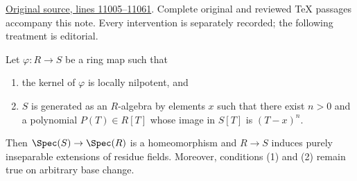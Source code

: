 \noindent\href{https://github.com/stacks/stacks-project/blob/a04446e57ec1fbc252a871afcec7752fb2807b14/algebra.tex\#L11005}{Original source, lines 11005--11061}. Complete original and reviewed TeX passages accompany this note. Every intervention is separately recorded; the following treatment is editorial.


\begin{lemma}
\label{editorial-source-lemma-universally-bijective}
Let $\varphi : R \to S$ be a ring map such that
\begin{enumerate}
\item the kernel of $\varphi$ is locally nilpotent, and
\item $S$ is generated as an $R$-algebra by elements $x$
such that there exist $n > 0$ and a polynomial $P(T) \in R[T]$
whose image in $S[T]$ is $(T - x)^n$.
\end{enumerate}
Then $\Spec(S) \to \Spec(R)$ is a homeomorphism and $R \to S$
induces purely inseparable extensions of residue fields.
Moreover, conditions (1) and (2) remain true on arbitrary base change.
\end{lemma}

